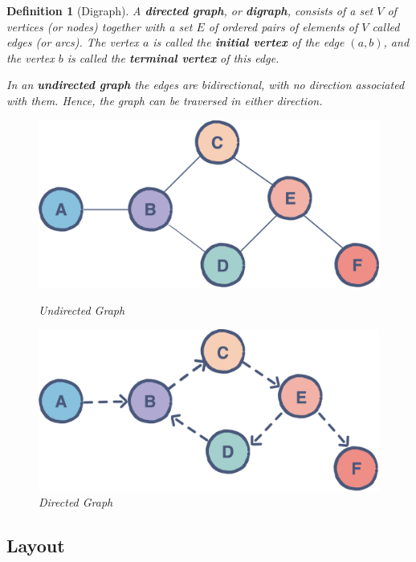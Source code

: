 \documentclass[cm,linguex]{glossa}
\theoremstyle{defn}
\newtheorem{defn}{Definition}
\theoremstyle{axiom}
\theoremstyle{thm}
\theoremstyle{lem}
\theoremstyle{cor}
\theoremstyle{prop}
\theoremstyle{rmk}
\begin{document}
\begin{defn}[Digraph]
A \textbf{directed graph}, or \textbf{digraph}, consists of a set $V$ of \emph{vertices} (or \emph{nodes}) together with a set $E$ of ordered pairs of elements of $V$ called \emph{edges} (or \emph{arcs}). The vertex $a$ is called the \textbf{initial vertex} of the edge $(a, b)$, and the vertex $b$ is called the \textbf{terminal vertex} of this edge.

In an \textbf{undirected graph} the edges are bidirectional, with no direction associated with them. Hence, the graph can be traversed in either direction.

\begin{figure}[H]
\centering
\begin{minipage}{.5\textwidth}
  \centering
  \includegraphics[scale=0.15]{fig/6.png}
  \caption{Undirected Graph}
\end{minipage}%
\begin{minipage}{.5\textwidth}
  \centering
  \includegraphics[scale=0.15]{fig/7.png}
  \caption{Directed Graph}
\end{minipage}
\end{figure}
\end{defn}

\hypertarget{layout}{%
\subsection{Layout}\label{layout}}
\end{document}
